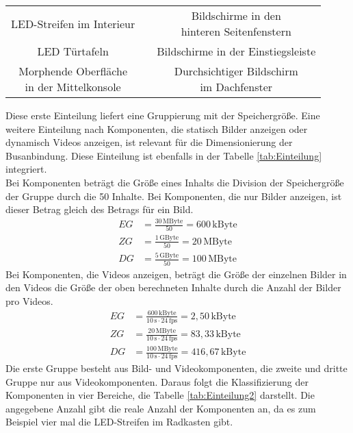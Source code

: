 \begin{table}[hbt]
\begin{tabular}{c|c|c}
		\parbox[t]{0.3\linewidth}{\centering LED-Streifen im Interieur} &  & \parbox[t]{0.3\linewidth}{\centering Bildschirme in den\\hinteren Seitenfenstern} \\
		\parbox[t]{0.3\linewidth}{\centering LED Türtafeln} & & \parbox[t]{0.3\linewidth}{\centering  Bildschirme in der Einstiegsleiste} \\
		\parbox[t]{0.3\linewidth}{\centering Morphende Oberfläche\\in der Mittelkonsole} & & \parbox[t]{0.3\linewidth}{\centering Durchsichtiger Bildschirm\\im Dachfenster} \\
	\end{tabular} 
\end{table}

Diese erste Einteilung liefert eine Gruppierung mit der Speichergröße. Eine weitere Einteilung nach Komponenten, die statisch Bilder anzeigen oder dynamisch Videos anzeigen, ist relevant für die Dimensionierung der Busanbindung. Diese Einteilung ist ebenfalls in der Tabelle \ref{tab:Einteilung} integriert. \\
Bei Komponenten beträgt die Größe eines Inhalts die Division der Speichergröße der Gruppe durch die 50 Inhalte. Bei Komponenten, die nur Bilder anzeigen, ist dieser Betrag gleich des Betrags für ein Bild.
\begin{align}
	EG &= \frac{30\,\mathrm{MByte}}{50} = 600\,\mathrm{kByte} \\
	ZG &= \frac{1\,\mathrm{GByte}}{50} =  20\,\mathrm{MByte} \\
	DG &= \frac{5\,\mathrm{GByte}}{50} = 100\,\mathrm{MByte}
\end{align}
Bei Komponenten, die Videos anzeigen, beträgt die Größe der einzelnen Bilder in den Videos die Größe der oben berechneten Inhalte durch die Anzahl der Bilder pro Videos.
\begin{align}
	EG &= \frac{600\,\mathrm{kByte}}{10\,\mathrm{s} \cdot 24\,\mathrm{fps}} = 2,50\,\mathrm{kByte} \\
	ZG &= \frac{20\,\mathrm{MByte}}{10\,\mathrm{s} \cdot 24\,\mathrm{fps}} = 83,33\,\mathrm{kByte} \\
	DG &= \frac{100\,\mathrm{MByte}}{10\,\mathrm{s} \cdot 24\,\mathrm{fps}} = 416,67\,\mathrm{kByte}
\end{align}
Die erste Gruppe besteht aus Bild- und Videokomponenten, die zweite und dritte Gruppe nur aus Videokomponenten. Daraus folgt die Klassifizierung der Komponenten in vier Bereiche, die Tabelle \ref{tab:Einteilung2} darstellt. Die angegebene Anzahl gibt die reale Anzahl der Komponenten an, da es zum Beispiel vier mal die LED-Streifen im Radkasten gibt.
